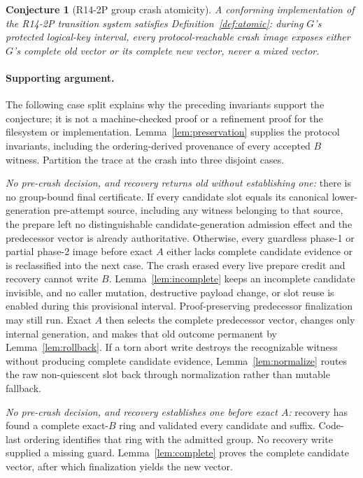 \documentclass[10pt,twocolumn]{article}
\newtheorem{conjecture}{Conjecture}
\theoremstyle{remark}
\begin{document}
\begin{conjecture}[R14-2P group crash atomicity]\label{thm:atomic}
A conforming implementation of the R14-2P transition system satisfies
Definition~\ref{def:atomic}: during $G$'s protected logical-key interval, every protocol-reachable
crash image exposes either $G$'s complete old vector or its complete new vector, never a mixed
vector.
\end{conjecture}
\paragraph{Supporting argument.}
The following case split explains why the preceding invariants support the conjecture; it is not a
machine-checked proof or a refinement proof for the filesystem or implementation.
Lemma~\ref{lem:preservation} supplies the protocol invariants, including the ordering-derived
provenance of every accepted $B$ witness. Partition the trace at the crash into three disjoint cases.

\emph{No pre-crash decision, and recovery returns old without establishing one:} there is no
group-bound final certificate. If every candidate slot equals its canonical lower-generation
pre-attempt source, including any witness belonging to that source, the prepare left no
distinguishable candidate-generation admission effect and the predecessor vector is already
authoritative. Otherwise, every guardless phase-1 or partial phase-2 image before exact $A$ either
lacks complete candidate evidence or is reclassified into the next case. The crash erased every
live prepare credit and recovery cannot write $B$. Lemma~\ref{lem:incomplete} keeps an incomplete
candidate invisible, and no caller mutation, destructive payload change, or slot reuse is enabled
during this provisional interval. Proof-preserving predecessor finalization may still run. Exact
$A$ then selects the complete predecessor vector, changes only internal generation,
and makes that old outcome permanent by Lemma~\ref{lem:rollback}. If a torn abort write destroys the
recognizable witness without producing complete candidate evidence, Lemma~\ref{lem:normalize}
routes the raw non-quiescent slot back through normalization rather than mutable fallback.

\emph{No pre-crash decision, and recovery establishes one before exact $A$:} recovery has found a
complete exact-$B$ ring and validated every candidate and suffix. Code-last ordering identifies
that ring with the admitted group. No recovery write supplied a missing guard.
Lemma~\ref{lem:complete} proves the complete candidate vector, after which finalization yields the
new vector.
\end{document}
